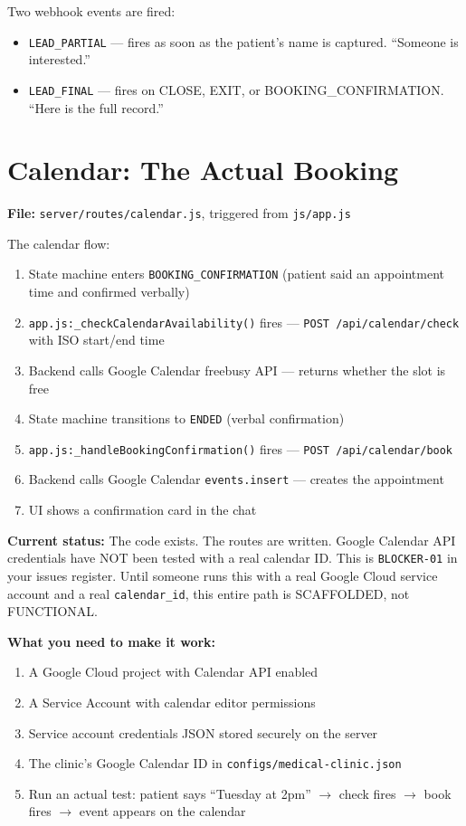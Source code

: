 \documentclass[12pt, a4paper]{report}
\newcommand{\ic}[1]{\texttt{\small\color{accentblue!70!black}#1}}
\begin{document}
Two webhook events are fired:
\begin{itemize}
  \item \ic{LEAD\_PARTIAL} --- fires as soon as the patient's name is captured.
        ``Someone is interested.''
  \item \ic{LEAD\_FINAL} --- fires on CLOSE, EXIT, or BOOKING\_CONFIRMATION. ``Here is
        the full record.''
\end{itemize}

\section{Calendar: The Actual Booking}

\textbf{File:} \ic{server/routes/calendar.js}, triggered from \ic{js/app.js}

The calendar flow:
\begin{enumerate}
  \item State machine enters \ic{BOOKING\_CONFIRMATION} (patient said an appointment
        time and confirmed verbally)
  \item \ic{app.js:\_checkCalendarAvailability()} fires --- \ic{POST /api/calendar/check}
        with ISO start/end time
  \item Backend calls Google Calendar freebusy API --- returns whether the slot is free
  \item State machine transitions to \ic{ENDED} (verbal confirmation)
  \item \ic{app.js:\_handleBookingConfirmation()} fires --- \ic{POST /api/calendar/book}
  \item Backend calls Google Calendar \ic{events.insert} --- creates the appointment
  \item UI shows a confirmation card in the chat
\end{enumerate}

\begin{warningbox}
  \textbf{Current status:} The code exists. The routes are written. Google Calendar API
  credentials have NOT been tested with a real calendar ID. This is \ic{BLOCKER-01} in
  your issues register. Until someone runs this with a real Google Cloud service account
  and a real \ic{calendar\_id}, this entire path is SCAFFOLDED, not FUNCTIONAL.
\end{warningbox}

\textbf{What you need to make it work:}
\begin{enumerate}
  \item A Google Cloud project with Calendar API enabled
  \item A Service Account with calendar editor permissions
  \item Service account credentials JSON stored securely on the server
  \item The clinic's Google Calendar ID in \ic{configs/medical-clinic.json}
  \item Run an actual test: patient says ``Tuesday at 2pm'' $\to$ check fires $\to$
        book fires $\to$ event appears on the calendar
\end{enumerate}
\end{document}
